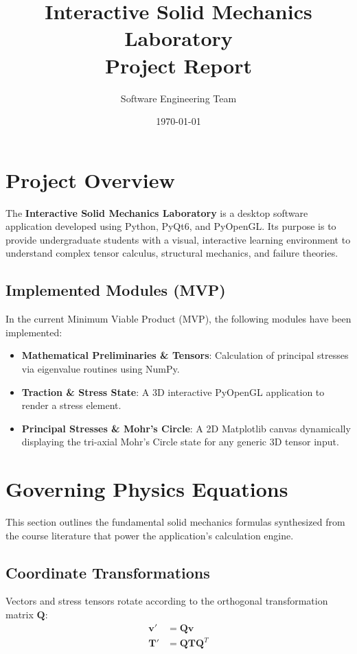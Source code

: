 \documentclass{article}
\title{Interactive Solid Mechanics Laboratory \\ Project Report}
\author{Software Engineering Team}
\date{\today}
\begin{document}
\maketitle

\section{Project Overview}
The \textbf{Interactive Solid Mechanics Laboratory} is a desktop software application developed using Python, PyQt6, and PyOpenGL. Its purpose is to provide undergraduate students with a visual, interactive learning environment to understand complex tensor calculus, structural mechanics, and failure theories.

\subsection{Implemented Modules (MVP)}
In the current Minimum Viable Product (MVP), the following modules have been implemented:
\begin{itemize}
    \item \textbf{Mathematical Preliminaries \& Tensors}: Calculation of principal stresses via eigenvalue routines using NumPy.
    \item \textbf{Traction \& Stress State}: A 3D interactive PyOpenGL application to render a stress element.
    \item \textbf{Principal Stresses \& Mohr's Circle}: A 2D Matplotlib canvas dynamically displaying the tri-axial Mohr's Circle state for any generic 3D tensor input.
\end{itemize}

\section{Governing Physics Equations}
This section outlines the fundamental solid mechanics formulas synthesized from the course literature that power the application's calculation engine.

\subsection{Coordinate Transformations}
Vectors and stress tensors rotate according to the orthogonal transformation matrix $\mathbf{Q}$:
\begin{align}
    \mathbf{v}' &= \mathbf{Q}\mathbf{v} \\
    \mathbf{T}' &= \mathbf{Q}\mathbf{T}\mathbf{Q}^T
\end{align}
\end{document}
